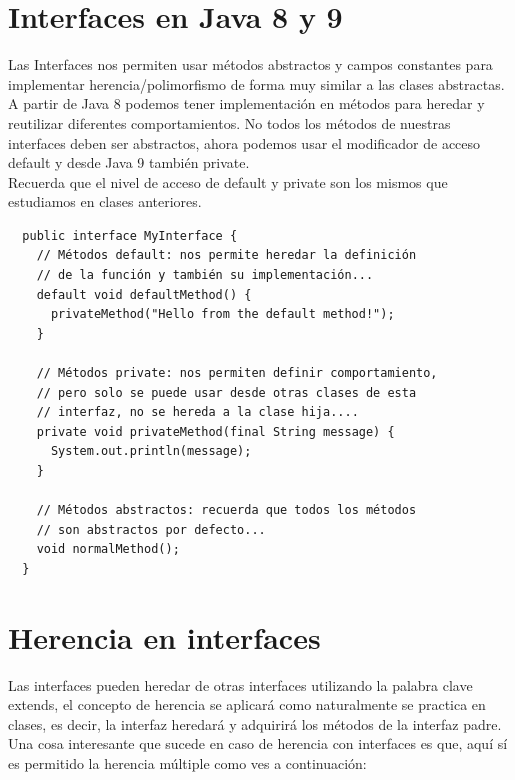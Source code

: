 \documentclass{article}
\begin{document}
\section{Interfaces en Java 8 y 9}%
Las Interfaces nos permiten usar métodos abstractos y campos constantes para
implementar herencia/polimorfismo de forma muy similar a las clases
abstractas.\\

A partir de Java 8 podemos tener implementación en métodos para heredar y
reutilizar diferentes comportamientos. No todos los métodos de nuestras
interfaces deben ser abstractos, ahora podemos usar el modificador de acceso
default y desde Java 9 también private.\\

Recuerda que el nivel de acceso de default y private son los mismos que
estudiamos en clases anteriores.\\

\begin{verbatim}
  public interface MyInterface {
    // Métodos default: nos permite heredar la definición
    // de la función y también su implementación...
    default void defaultMethod() {
      privateMethod("Hello from the default method!");
    }

    // Métodos private: nos permiten definir comportamiento,
    // pero solo se puede usar desde otras clases de esta
    // interfaz, no se hereda a la clase hija....
    private void privateMethod(final String message) {
      System.out.println(message);
    }

    // Métodos abstractos: recuerda que todos los métodos
    // son abstractos por defecto...
    void normalMethod();
  }
\end{verbatim}



\section{Herencia en interfaces}%
Las interfaces pueden heredar de otras interfaces utilizando la palabra clave
extends, el concepto de herencia se aplicará como naturalmente se practica en
clases, es decir, la interfaz heredará y adquirirá los métodos de la interfaz
padre.\\

Una cosa interesante que sucede en caso de herencia con interfaces es que, aquí
sí es permitido la herencia múltiple como ves a continuación:\\
\end{document}
